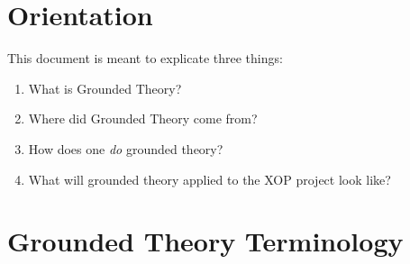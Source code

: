 \documentclass[10pt, letterpaper]{article}
\begin{document}
\section*{Orientation}
\label{sec:orgfa6a69d}
This document is meant to explicate three things:
\begin{enumerate}
\item What is Grounded Theory?
\item Where did Grounded Theory come from?
\item How does one \emph{do} grounded theory?
\item What will grounded theory applied to the XOP project look like?
\end{enumerate}

\section*{Grounded Theory Terminology}
\label{sec:orga164814}
\end{document}
